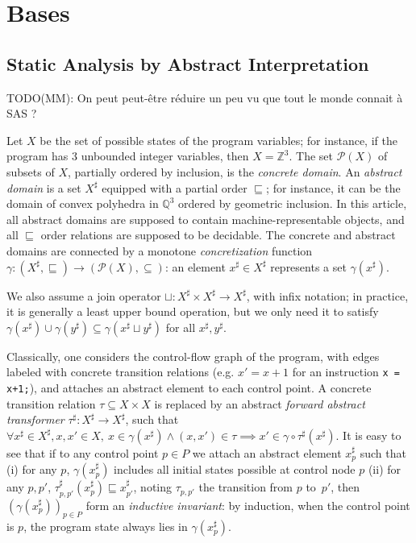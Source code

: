 \documentclass{llncs}
\newcommand{\abstr}[1]{#1^\sharp}
\newcommand{\parts}[1]{\mathscr{P}(#1)}
\newcommand{\ZZ}{\mathbb{Z}}
\newcommand{\QQ}{\mathbb{Q}}
\newcommand{\avirer}[1]{{\color{red} #1}}
\newcommand{\MM}[1]{{\color{blue} TODO(MM): #1}}
\newcommand{\avirer}[1]{}
\newcommand{\MM}[1]{}
\begin{document}
\section{Bases}
\subsection{Static Analysis by Abstract Interpretation}
\label{sec:static_analysis}
\MM{On peut peut-être réduire un peu vu que tout le monde connait à
  SAS ?}

Let $X$ be the set of possible states of the program variables; for instance, if the program has 3 unbounded integer variables, then $X = \ZZ^3$. The set $\parts{X}$ of subsets of $X$, partially ordered by inclusion, is the \emph{concrete domain}. An \emph{abstract domain} is a set $\abstr{X}$ equipped with a partial order $\sqsubseteq$; for instance, it can be the domain of convex polyhedra in $\QQ^3$ ordered by geometric inclusion. \avirer{In this article, all abstract domains are supposed to contain machine-representable objects, and all $\sqsubseteq$ order relations are supposed to be decidable.}
The concrete and abstract domains are connected by a monotone \emph{concretization} function $\gamma: \left(\abstr{X},\sqsubseteq\right) \rightarrow (\parts{X},\subseteq)$: an element $\abstr{x} \in \abstr{X}$ represents a set $\gamma(\abstr{x})$.%
%

We also assume a join operator $\sqcup: \abstr{X} \times \abstr{X} \rightarrow \abstr{X}$, with infix notation; in practice, it is generally a least upper bound operation, but we only need it to satisfy $\gamma(\abstr{x}) \cup \gamma(\abstr{y}) \subseteq \gamma(\abstr{x} \sqcup \abstr{y})$ for all $\abstr{x},\abstr{y}$.

Classically, one considers the control-flow graph of the program, with edges labeled with concrete transition relations (e.g. $x' = x+1$ for an instruction \lstinline|x = x+1;|), and attaches an abstract element to each control point.
A concrete transition relation $\tau \subseteq X \times X$ is replaced by an abstract \emph{forward abstract transformer} $\abstr{\tau}: \abstr{X} \rightarrow \abstr{X}$, such that
\(
\forall \abstr{x} \in \abstr{X}, x,x' \in X,~
x \in \gamma(\abstr{x}) \land (x,x') \in \tau \implies
x' \in \gamma \circ \abstr{\tau}(\abstr{x})
\).
It is easy to see that if to any control point $p \in P$ we attach an abstract element $\abstr{x}_p$ such that
(i) for any $p$, $\gamma(\abstr{x}_p)$ includes all initial states possible at control node $p$
(ii) for any $p,p'$, $\abstr{\tau}_{p,p'} (\abstr{x}_p) \sqsubseteq \abstr{x}_{p'}$, noting $\tau_{p,p'}$ the transition from $p$ to~$p'$, then $(\gamma(\abstr{x}_p))_{p \in P}$ form an \emph{inductive invariant}: by induction, when the control point is $p$, the program state always lies in $\gamma(\abstr{x}_p)$.
\end{document}
